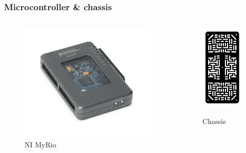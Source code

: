 \documentclass
   [kulak] %
   {kulakbeamer}
\begin{document}
\begin{frame}
	\frametitle{Microcontroller \& chassis}
	\begin{columns}
		\begin{figure}
			\centering
			\includegraphics[width=.7\textwidth]{NI-myrio}
			\caption{NI MyRio}%
		\end{figure}
		\begin{figure}
			\centering
			\includegraphics[width=.7\textwidth]{chassis}
			\caption{Chassis}\cite{RobotChassisRechthoekigZwart}
		\end{figure}
		
	\end{columns}
	
\end{frame}
\end{document}

